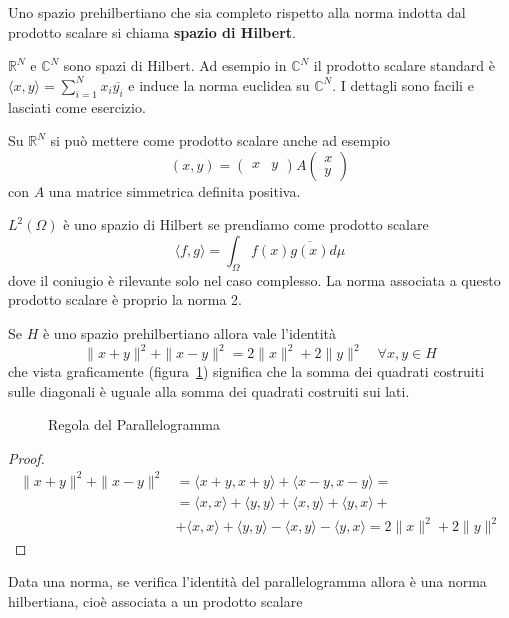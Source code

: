\begin{definition}
    Uno spazio prehilbertiano che sia completo rispetto alla norma indotta dal
    prodotto scalare si chiama \textbf{spazio di Hilbert}.
\end{definition}
\begin{example}
    \(\mathbb{R}^{N}\) e \(\mathbb{C}^{N}\) sono spazi di Hilbert. Ad esempio in
    \(\mathbb{C}^{N}\) il prodotto scalare standard è \(\langle x, y \rangle =
    \sum_{i=1}^{N} x_{i} \overline{y_{i}}\) e induce la norma euclidea su
    \(\mathbb{C}^{N}\). I dettagli sono facili e lasciati come esercizio.

    Su \(\mathbb{R}^{N}\) si può mettere come prodotto scalare anche ad esempio
    \[
        {(x, y)} = \begin{pmatrix}
            x & y
        \end{pmatrix} A \begin{pmatrix}
            x \\ y
        \end{pmatrix}
    \]
    con \(A\) una matrice simmetrica definita positiva.
\end{example}
\begin{example}
    \(L^{2}{(\Omega)}\) è uno spazio di Hilbert se prendiamo come prodotto
    scalare 
    \[
        \langle f, g \rangle = \int_{\Omega} f(x) \overline{g(x)} d\mu
    \]
    dove il coniugio è rilevante solo nel caso complesso. La norma associata a
    questo prodotto scalare è proprio la norma 2.
\end{example}
\begin{proposition}\label{prop:parallelogramma}
    Se \(H\) è uno spazio prehilbertiano allora vale l'identità
    \[
        \|x + y\|^2 + \|x - y\|^2 = 2\|x\|^2 + 2\|y\|^2 \quad \forall x, y \in H
    \]
    che vista graficamente (figura~\ref{fig:parallelogramma}) significa che la somma dei quadrati costruiti
    sulle diagonali è uguale alla somma dei quadrati costruiti sui lati.
\end{proposition}
\begin{figure}[ht]
    \centering
    \caption{Regola del Parallelogramma}\label{fig:parallelogramma}
\end{figure}
\begin{proof}
    \begin{align*}
        \|x+y\|^2 + \|x-y\|^2 &= \langle x+y, x+y \rangle + \langle x-y, x-y
        \rangle = \\ &= \langle x, x \rangle + \langle y, y \rangle + \langle x, y
        \rangle + \langle y, x \rangle + \\ &+ \langle x, x \rangle + \langle y, y
        \rangle - \langle x, y \rangle - \langle y, x \rangle = 2\|x\|^2 +
        2\|y\|^2
    \end{align*}
\end{proof}
    Data una norma, se  verifica l'identità del parallelogramma allora
     è una norma hilbertiana, cioè associata a un prodotto scalare

